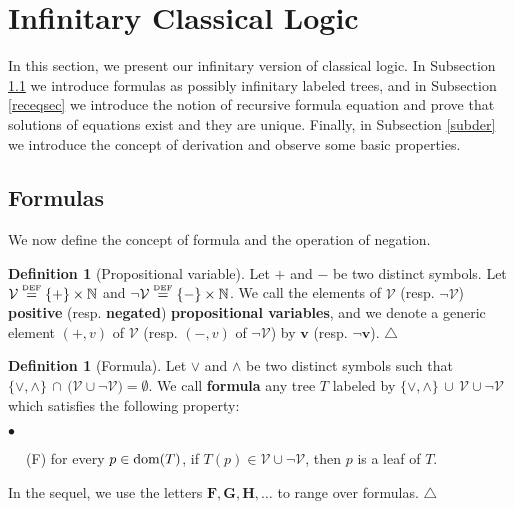 \documentclass[copyright,creativecommons]{eptcs}
\newcommand{\NN}{\mathbb{N}}
\newcommand{\eqdef}{\stackrel{\text{\tiny \textnormal{DEF}}}{=}}
\newcommand{\cV}{\mathcal{V}}
\newcommand{\bF}{\mathbf{F}}
\newcommand{\bG}{\mathbf{G}}
\newcommand{\bH}{\mathbf{H}}
\newcommand{\bbv}{\mathbf{v}}
\newcommand{\dom}{\ensuremath{\textnormal{dom}}}
\theoremstyle{definition}
\newtheorem{Definition}[theorem]{Definition}
\newcommand{\squishlist}{
 \begin{list}{$\bullet$}
  { \setlength{\itemsep}{0pt}
     \setlength{\parsep}{3pt}
     \setlength{\topsep}{3pt}
     \setlength{\partopsep}{0pt}
     \setlength{\leftmargin}{1em}
     \setlength{\labelwidth}{1.5em}
     \setlength{\labelsep}{0.5em} } }
\newcommand{\squishend}{
  \end{list}  }
\begin{document}
\section{Infinitary Classical Logic} \label{sec3}


In this section, we present
 our infinitary version of classical logic.
In Subsection \ref{forsec}
we introduce formulas
as possibly infinitary labeled trees,
and in Subsection \ref{receqsec}
we introduce the notion of recursive formula equation and prove that
solutions of equations exist and they are unique.
Finally, in Subsection \ref{subder} we introduce the concept of derivation
and observe some basic properties.




\subsection{Formulas} \label{forsec}
We  now define the concept of   formula
and the operation of  negation.

 \begin{Definition}[Propositional variable]
 Let $+$ and $-$ be two distinct symbols. Let $\cV \eqdef \{+\} \times \NN$ and $\neg \cV \eqdef  \{-\} \times \NN$.
  We call  the elements of $\cV$ (resp. $\neg \cV$)  \textbf{positive} (resp. \textbf{negated}) \textbf{propositional
 variables}, and
 we denote a generic element $(+,v)$ of $\cV$ (resp. $(-,v)$ of  $\neg \cV$) by $\bbv$  (resp. $\neg \bbv$).
   \hfill$\triangle$\end{Definition}

\begin{Definition}[Formula] \label{formula}
 Let $\vee$ and $\wedge$ be two distinct symbols
 such that $ \{ \vee ,\wedge \} \, \cap \, \big(\cV \cup \neg \cV \big) = \emptyset$.
We call  \textbf{formula}  any tree  $T$ labeled by $\{ \vee ,\wedge \} \, \cup \,  \cV \cup \neg \cV$ which satisfies the following property:
 \squishlist
\item[$\phantom{ab}$ (F)]  \qquad   for every $p \in \dom(T)$, if   $T(p) \in \cV \cup \neg \cV$,  then  $p$ is a leaf of $T$.
\squishend
In the sequel, we use the letters $\bF, \bG ,\bH ,\ldots$ to range over formulas.
\hfill$\triangle$
 \end{Definition}
\end{document}
